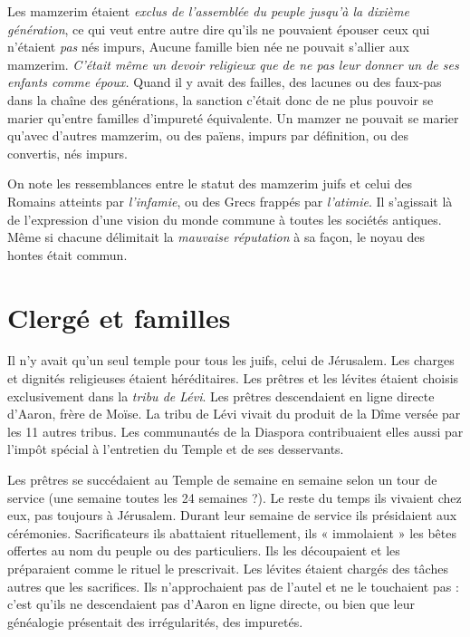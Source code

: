  Les mamzerim étaient \emph{exclus de l'assemblée du peuple jusqu'à la dixième génération}, ce qui veut entre autre dire qu'ils ne pouvaient épouser ceux qui n'étaient \emph{pas} nés impurs, Aucune famille bien née ne pouvait s'allier aux mamzerim. \emph{C'était même un devoir religieux que de ne pas leur donner un de ses enfants comme époux.} Quand il y avait des failles, des lacunes ou des faux-pas dans la chaîne des générations, la sanction c'était donc de ne plus pouvoir se marier qu'entre familles d'impureté équivalente. Un mamzer ne pouvait se marier qu'avec d'autres mamzerim, ou des païens, impurs par définition, ou des convertis, nés impurs. 

 On note les ressemblances entre le statut des mamzerim juifs et celui des Romains atteints par \emph{l'infamie}, ou des Grecs frappés par \emph{l'atimie}. Il s'agissait là de l'expression d'une vision du monde commune à toutes les sociétés antiques. Même si chacune délimitait la \emph{mauvaise réputation} à sa façon, le noyau des hontes était commun. 


\section{Clergé et familles}

 Il n'y avait qu'un seul temple pour tous les juifs, celui de Jérusalem. Les charges et dignités religieuses étaient héréditaires. Les prêtres et les lévites étaient choisis exclusivement dans la \emph{tribu de Lévi}. Les prêtres descendaient en ligne directe d'Aaron, frère de Moïse. La tribu de Lévi vivait du produit de la Dîme versée par les 11 autres tribus. Les communautés de la Diaspora contribuaient elles aussi par l'impôt spécial  à l'entretien du Temple et de ses desservants. 

 Les prêtres se succédaient au Temple de semaine en semaine selon un tour de service (une semaine toutes les 24 semaines ?). Le reste du temps ils vivaient chez eux, pas toujours à Jérusalem. Durant leur semaine de service ils présidaient aux cérémonies. Sacrificateurs ils abattaient rituellement, ils « immolaient » les bêtes offertes au nom du peuple ou des particuliers. Ils les découpaient et les préparaient comme le rituel le prescrivait. Les lévites étaient chargés des tâches autres que les sacrifices. Ils n'approchaient pas de l'autel et ne le touchaient pas : c'est qu'ils ne descendaient pas d'Aaron en ligne directe, ou bien que leur généalogie présentait des irrégularités, des impuretés.

